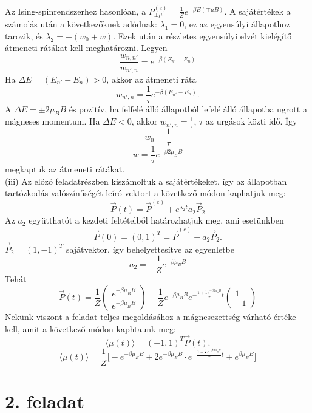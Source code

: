 \documentclass[12pt]{article}
\begin{document}
Az Ising-spinrendszerhez hasonlóan, a  $P^{(e)}_{\pm\mu} = \frac{1}{Z}e^{-\beta E(\mp \mu B)}$. A sajátértékek a számolás után a következőknek adódnak: $\lambda_1 = 0$, ez az egyensúlyi állapothoz tarozik, és $\lambda_2 = -(w_0 + w)$. Ezek után a részletes egyensúlyi elvét kielégítő átmeneti rátákat kell meghatározni. Legyen 
$$\frac{w_{n, n'}}{w_{n', n}} = e^{-\beta(E_{n'}-E_{n})}  $$
Ha $\Delta E = (E_{n'}-E_{n})> 0$, akkor az átmeneti ráta
$$w_{n',n} =\frac{1}{\tau}e^{-\beta(E_{n'}-E_{n})} .$$
A $\Delta E = \pm 2\mu_B B$ és pozitív, ha felfelé álló állapotból lefelé álló állapotba ugrott a mágneses momentum. Ha $\Delta E < 0$, akkor $w_{n',n} = \frac{1}{\tau}$, $\tau$ az urgások közti idő. Így 
$$w_0 = \frac{1}{\tau}$$
$$w= \frac{1}{\tau}e^{-\beta 2 \mu_B B}$$
megkaptuk az átmeneti rátákat.\\
(iii) Az előző feladatrészben kiszámoltuk a sajátértékeket, így az állapotban tartózkodás valószínűségét leíró vektort a következő módon kaphatjuk meg:
$$\vec{P}(t) = \vec{P}^{(e)} + e^{\lambda_2 t} a_2 \vec{P}_2$$
Az $a_2$ együtthatót a kezdeti feltételből határozhatjuk meg, ami esetünkben
$$\vec{P}(0) = (0, 1)^T = \vec{P}^{(e)} + a_2\vec{P}_2.$$
$\vec{P}_2 = (1, -1)^T$ sajátvektor, így behelyettesítve az egyenletbe
$$a_2 = -\frac{1}{Z}e^{-\beta \mu_B B}$$
Tehát
\[
 \vec{P}(t) = \frac{1}{Z}
\begin{pmatrix}
e^{-\beta \mu_B B}\\
e^{+\beta \mu_B B}
\end{pmatrix}
-\frac{1}{Z}e^{-\beta \mu_B B} e^{-\frac{1+\frac{1}{\tau}e^{-\beta 2 \mu_B B}}{\tau}t}
\begin{pmatrix}
1\\
-1
\end{pmatrix}
\]
Nekünk viszont a feladat teljes megoldásához a mágnesezettség várható értéke kell, amit a következő módon kaphtaunk meg:
$$\langle \mu(t)\rangle = (-1, 1)^T \vec{P}(t).$$
$$\langle \mu(t)\rangle = \frac{1}{Z}\Big [ -e^{-\beta \mu_B B}+2e^{-\beta \mu_B B}\cdot  e^{-\frac{1+\frac{1}{\tau}e^{-\beta 2 \mu_B B}}{\tau}t} +e^{\beta \mu_B B} \Big ]$$





\newpage
\section*{2. feladat}
\end{document}
